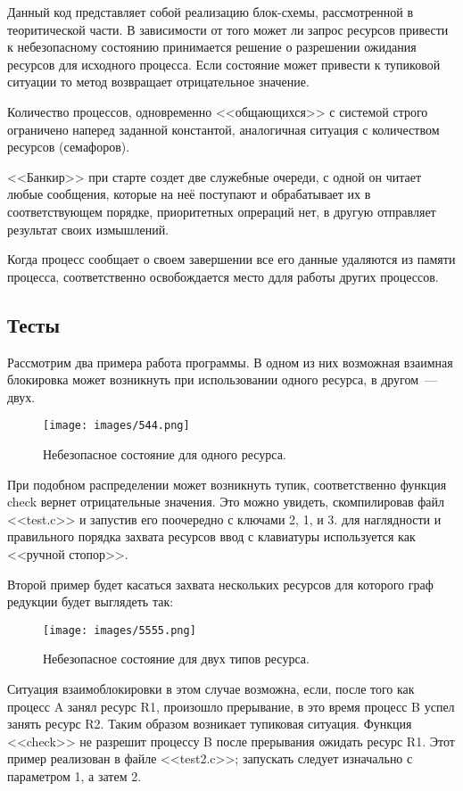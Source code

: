 Данный код представляет собой реализацию блок-схемы, рассмотренной в теоритической части. В зависимости от того может ли запрос ресурсов привести к небезопасному состоянию принимается решение о разрешении ожидания ресурсов для исходного процесса. Если состояние может привести к тупиковой ситуации то метод возвращает отрицательное значение.

Количество процессов, одновременно <<общающихся>> с системой строго ограничено наперед заданной константой, аналогичная ситуация с количеством ресурсов (семафоров). 

<<Банкир>> при старте создет две служебные очереди, с одной он читает любые сообщения, которые на неё поступают и обрабатывает их в соответствующем порядке, приоритетных опрераций нет, в другую отправляет результат своих измышлений.   

Когда процесс сообщает о своем завершении все его данные удаляются из памяти процесса, соответственно освобождается место ддля работы других процессов. 
\subsection{Тесты}
Рассмотрим два примера работа программы. В одном из них возможная взаимная блокировка может возникнуть при использовании одного ресурса, в другом~--- двух. 
\\

\begin{figure}[h]
\centering
\texttt{[image: images/544.png]}
\caption{Небезопасное состояние для одного ресурса.}
\label{fig.0}
\end{figure}

При подобном распределении может возникнуть тупик, соответственно функция check вернет отрицательные значения. Это можно увидеть, скомпилировав файл <<test.c>> и запустив его поочередно с ключами 2, 1, и 3. для наглядности и правильного порядка захвата ресурсов ввод с клавиатуры используется как <<ручной стопор>>.

Второй пример будет касаться захвата нескольких ресурсов для которого граф редукции будет выглядеть так:

\begin{figure}[h]
\centering
\texttt{[image: images/5555.png]}
\caption{Небезопасное состояние для двух типов ресурса.}
\label{fig.0}
\end{figure}

Ситуация взаимоблокировки в этом случае возможна, если, после того как процесс A занял ресурс R1, произошло прерывание, в это время процесс B успел занять ресурс R2. Таким образом возникает тупиковая ситуация. Функция <<check>> не разрешит процессу B после прерывания ожидать ресурс R1. Этот пример реализован в файле <<test2.c>>; запускать следует изначально с параметром 1, а затем 2.


\endinput
